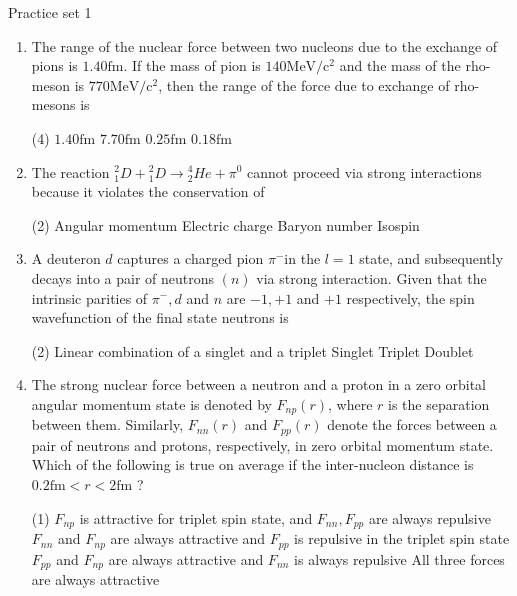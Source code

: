 \newpage
\begin{abox}
	Practice set 1
	\end{abox}
\begin{enumerate}
	\item The range of the nuclear force between two nucleons due to the exchange of pions is $1.40 \mathrm{fm}$. If the mass of pion is $140 \mathrm{MeV} / \mathrm{c}^{2}$ and the mass of the rho-meson is $770 \mathrm{MeV} / \mathrm{c}^{2}$, then the range of the force due to exchange of rho-mesons is
{}
\begin{tasks}(4)
	\task[\textbf{A.}] $1.40 \mathrm{fm}$
	\task[\textbf{B.}]$7.70 \mathrm{fm}$
	\task[\textbf{C.}]$0.25 \mathrm{fm}$
	\task[\textbf{D.}]$0.18 \mathrm{fm}$
\end{tasks}
\item  The reaction ${ }_1^2 D+{ }_1^2 D \rightarrow{ }_2^4 H e+\pi^0$ cannot proceed via strong interactions because it violates the conservation of
{}
 \begin{tasks}(2)
	\task[\textbf{a.}]Angular momentum
	\task[\textbf{b.}]Electric charge
	\task[\textbf{c.}]Baryon number
	\task[\textbf{d.}]Isospin 
\end{tasks}
\item  A deuteron $d$ captures a charged pion $\pi^{-}$in the $l=1$ state, and subsequently decays into a pair of neutrons $(n)$ via strong interaction. Given that the intrinsic parities of $\pi^{-}, d$ and $n$ are $-1,+1$ and $+1$ respectively, the spin wavefunction of the final state neutrons is
{}
 \begin{tasks}(2)
	\task[\textbf{a.}]Linear combination of a singlet and a triplet
	\task[\textbf{b.}]Singlet
	\task[\textbf{c.}]Triplet
	\task[\textbf{d.}]Doublet 
\end{tasks}
\item  The strong nuclear force between a neutron and a proton in a zero orbital angular momentum state is denoted by $F_{n p}(r)$, where $r$ is the separation between them. Similarly, $F_{n n}(r)$ and $F_{p p}(r)$ denote the forces between a pair of neutrons and protons, respectively, in zero orbital momentum state. Which of the following is true on average if the inter-nucleon distance is $0.2 \mathrm{fm}<r<2 \mathrm{fm}$ ?
 \begin{tasks}(1)
	\task[\textbf{a.}]$F_{n p}$ is attractive for triplet spin state, and $F_{n n}, F_{p p}$ are always repulsive
	\task[\textbf{b.}]$F_{n n}$ and $F_{n p}$ are always attractive and $F_{p p}$ is repulsive in the triplet spin state
	\task[\textbf{c.}]$F_{p p}$ and $F_{n p}$ are always attractive and $F_{n n}$ is always repulsive
	\task[\textbf{d.}]All three forces are always attractive 
\end{tasks}
\end{enumerate}

